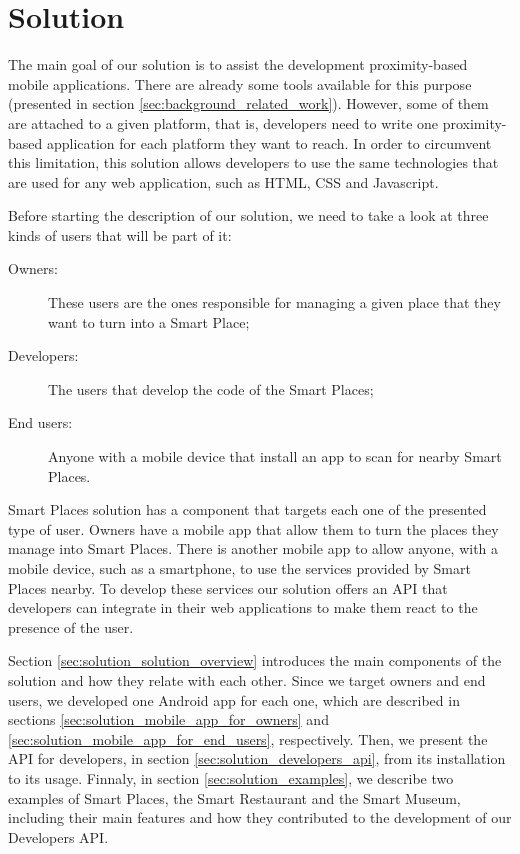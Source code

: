 
\chapter{Solution}
\label{chapter:solution}
The main goal of our solution is to assist
the development proximity-based mobile applications.
There are already some tools available for this purpose (presented in section \ref{sec:background_related_work}).
However, some of them are attached to a given platform, that is, developers
need to write one proximity-based application for each platform they want
to reach.
In order to circumvent this limitation, this solution allows developers
to use the same technologies that are used for any web application, such as \gls{HTML}, \gls{CSS} and Javascript.

Before starting the description of our solution, we need to take a look at three kinds of users that will be part of it:
\begin{description}
  \item[Owners:] These users are the ones responsible for managing a given place that they want to turn into a Smart Place;
  \item[Developers:] The users that develop the code of the Smart Places;
  \item[End users:] Anyone with a mobile device that install an app to scan for nearby Smart Places.
\end{description}

Smart Places solution has a component that targets each one of the presented type of user.
Owners have a mobile app that allow them to turn the places they manage into Smart Places.
There is another mobile app to allow anyone, with a mobile device, such as a smartphone, to use the services provided by Smart Places nearby.
To develop these services our solution offers an \gls{API} that developers can integrate in their web applications to make them react to the presence of the user.

Section \ref{sec:solution_solution_overview} introduces the main components of the solution and how they relate with each other.
Since we target owners and end users, we developed one Android app for each one, which are described in sections \ref{sec:solution_mobile_app_for_owners} and \ref{sec:solution_mobile_app_for_end_users}, respectively.
Then, we present the \gls{API} for developers, in section \ref{sec:solution_developers_api}, from its installation to its usage.
Finnaly, in section \ref{sec:solution_examples}, we describe two examples of Smart Places, the Smart Restaurant and the Smart Museum, including their main features and how they contributed to the development of our Developers \gls{API}.

